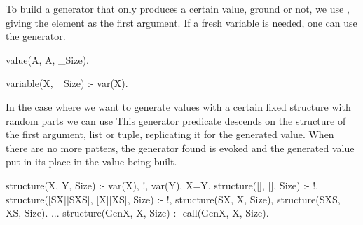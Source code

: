 To build a generator that only produces a certain value, ground or not,
we use , giving the element as the first argument.
%
If a fresh variable is needed, one can use the 
generator.
\begin{yapcode}
 value(A, A, _Size).

 variable(X, _Size) :- var(X).
\end{yapcode}
%
In the case where we want to generate values with a certain fixed
structure with random parts we can use 
%
This generator predicate descends on the structure of the first
argument, list or tuple, replicating it for the generated value.
%
When there are no more patters, the generator found is evoked and the
generated value put in its place in the value being built.
%
\begin{yapcode}
 structure(X, Y, Size) :-
   var(X), !, var(Y), X=Y.
 structure([], [], Size) :- !.
 structure([SX||SXS], [X||XS], Size) :-
   !,
   structure(SX, X, Size),
   structure(SXS, XS, Size).
 ...
 structure(GenX, X, Size) :-
   call(GenX, X, Size).
\end{yapcode}



\begin{yapcode}
\end{yapcode}

\begin{yapcode}
\end{yapcode}
\begin{yapcode}
\end{yapcode}

